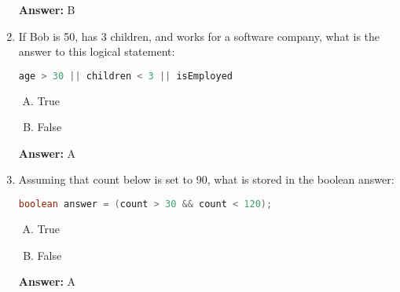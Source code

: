 \documentclass[12pt]{article}
\begin{document}
\begin{enumerate}[1.]
    \bigskip

    \textbf{Answer:} B

    \item If Bob is 50, has 3 children, and works for a software company, what
    is the answer to this logical statement:

    \bigskip

    \begin{lstlisting}[language=Java]
    age > 30 || children < 3 || isEmployed
    \end{lstlisting}

    \begin{enumerate}[A.]
        \item True
        \item False
    \end{enumerate}

    \bigskip

    \textbf{Answer:} A

    \item Assuming that count below is set to 90, what is stored in the boolean
    answer:

    \bigskip

    \begin{lstlisting}[language=Java]
    boolean answer = (count > 30 && count < 120);
    \end{lstlisting}

    \begin{enumerate}[A.]
        \item True
        \item False
    \end{enumerate}

    \bigskip

    \textbf{Answer:} A

\end{enumerate}
\end{document}
